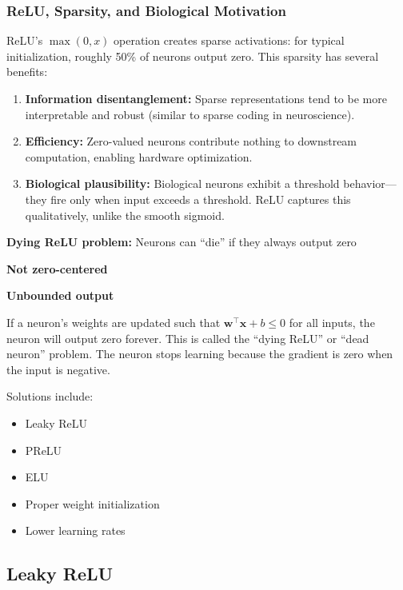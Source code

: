 \subsubsection{ReLU, Sparsity, and Biological Motivation}

ReLU's $\max(0, x)$ operation creates sparse activations: for typical initialization, roughly 50\% of neurons output zero. This sparsity has several benefits:
\begin{enumerate}
    \item \textbf{Information disentanglement:} Sparse representations tend to be more interpretable and robust (similar to sparse coding in neuroscience).
    \item \textbf{Efficiency:} Zero-valued neurons contribute nothing to downstream computation, enabling hardware optimization.
    \item \textbf{Biological plausibility:} Biological neurons exhibit a threshold behavior---they fire only when input exceeds a threshold. ReLU captures this qualitatively, unlike the smooth sigmoid.
\end{enumerate}

\begin{disadvantages}
    \item \textbf{Dying ReLU problem:} Neurons can ``die'' if they always output zero
    \item \textbf{Not zero-centered}
    \item \textbf{Unbounded output}
\end{disadvantages}

\begin{note}
If a neuron's weights are updated such that $\mathbf{w}^\top \mathbf{x} + b \leq 0$ for all inputs, the neuron will output zero forever. This is called the ``dying ReLU'' or ``dead neuron'' problem. The neuron stops learning because the gradient is zero when the input is negative.

Solutions include:
\begin{itemize}
    \item Leaky ReLU
    \item PReLU
    \item ELU
    \item Proper weight initialization
    \item Lower learning rates
\end{itemize}
\end{note}

\subsection{Leaky ReLU}


